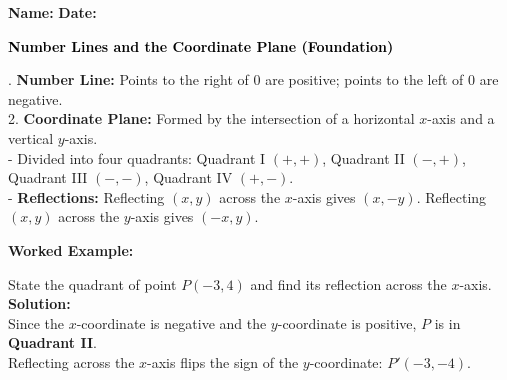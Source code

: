 \documentclass[12pt, letterpaper, fleqn]{article}
\begin{document}
\textbf{Name:} \underline{\hspace{5cm}}
\hfill
\textbf{Date:} \underline{\hspace{3cm}}\\

\begin{tcolorbox}[colback=black!10]
    \large\textcolor{black}{\textbf{Number Lines and the Coordinate Plane (Foundation)}}
\end{tcolorbox}

\vspace{3mm}

. \textbf{Number Line:} Points to the right of 0 are positive; points to the left of 0 are negative. \\
2. \textbf{Coordinate Plane:} Formed by the intersection of a horizontal $x$-axis and a vertical $y$-axis. \\
- Divided into four quadrants: Quadrant I $(+,+)$, Quadrant II $(-,+)$, Quadrant III $(-,-)$, Quadrant IV $(+,-)$. \\
- \textbf{Reflections:} Reflecting $(x,y)$ across the $x$-axis gives $(x, -y)$. Reflecting $(x,y)$ across the $y$-axis gives $(-x, y)$.

\vspace{4mm}

\begin{tcolorbox}[colback=white, colframe=black!25, boxrule=0.6pt, arc=4mm, left=6mm, right=6mm, top=5mm, bottom=5mm]
\textbf{Worked Example:}

\medskip
\noindent
State the quadrant of point $P(-3, 4)$ and find its reflection across the $x$-axis.\\
\textbf{Solution:} \\
Since the $x$-coordinate is negative and the $y$-coordinate is positive, $P$ is in \textbf{Quadrant II}.\\
Reflecting across the $x$-axis flips the sign of the $y$-coordinate: \textbf{$P'(-3, -4)$}.
\end{tcolorbox}

\vspace{4mm}
\end{document}
